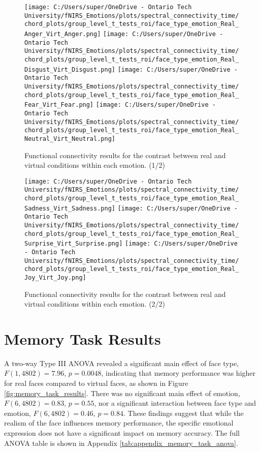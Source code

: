 \begin{figure}[H]
  \centering
  \texttt{[image: C:/Users/super/OneDrive - Ontario Tech University/fNIRS\_Emotions/plots/spectral\_connectivity\_time/chord\_plots/group\_level\_t\_tests\_roi/face\_type\_emotion\_Real\_Anger\_Virt\_Anger.png]}
  \texttt{[image: C:/Users/super/OneDrive - Ontario Tech University/fNIRS\_Emotions/plots/spectral\_connectivity\_time/chord\_plots/group\_level\_t\_tests\_roi/face\_type\_emotion\_Real\_Disgust\_Virt\_Disgust.png]}
  \texttt{[image: C:/Users/super/OneDrive - Ontario Tech University/fNIRS\_Emotions/plots/spectral\_connectivity\_time/chord\_plots/group\_level\_t\_tests\_roi/face\_type\_emotion\_Real\_Fear\_Virt\_Fear.png]}
  \texttt{[image: C:/Users/super/OneDrive - Ontario Tech University/fNIRS\_Emotions/plots/spectral\_connectivity\_time/chord\_plots/group\_level\_t\_tests\_roi/face\_type\_emotion\_Real\_Neutral\_Virt\_Neutral.png]}
  \caption[FC: Face Type \texorpdfstring{$\times$}{x} Emotion Contrasts]{Functional connectivity results for the contrast between real and virtual conditions within each emotion. (1/2)}
  \label{fig:fc_real_vs_virtual_emotion_analysis}
\end{figure}

\FloatBarrier %

\begin{figure}[H]
  \ContinuedFloat
  \centering
  \texttt{[image: C:/Users/super/OneDrive - Ontario Tech University/fNIRS\_Emotions/plots/spectral\_connectivity\_time/chord\_plots/group\_level\_t\_tests\_roi/face\_type\_emotion\_Real\_Sadness\_Virt\_Sadness.png]}
  \texttt{[image: C:/Users/super/OneDrive - Ontario Tech University/fNIRS\_Emotions/plots/spectral\_connectivity\_time/chord\_plots/group\_level\_t\_tests\_roi/face\_type\_emotion\_Real\_Surprise\_Virt\_Surprise.png]}
  \texttt{[image: C:/Users/super/OneDrive - Ontario Tech University/fNIRS\_Emotions/plots/spectral\_connectivity\_time/chord\_plots/group\_level\_t\_tests\_roi/face\_type\_emotion\_Real\_Joy\_Virt\_Joy.png]}
  \caption*{Functional connectivity results for the contrast between real and virtual conditions within each emotion. (2/2)}
\end{figure}

\section{Memory Task Results}
A two-way Type III ANOVA revealed a significant main effect of face type, $F(1,4802)=7.96$, $p=0.0048$, indicating that memory performance was higher for real faces compared to virtual faces, as shown in Figure \ref{fig:memory_task_results}.
There was no significant main effect of emotion, $F(6,4802)=0.83$, $p=0.55$, nor a significant interaction between face type and emotion, $F(6,4802)=0.46$, $p=0.84$. 
These findings suggest that while the realism of the face influences memory performance, the specific emotional expression does not have a significant impact on memory accuracy.
The full ANOVA table is shown in Appendix \ref{tab:appendix_memory_task_anova}.

